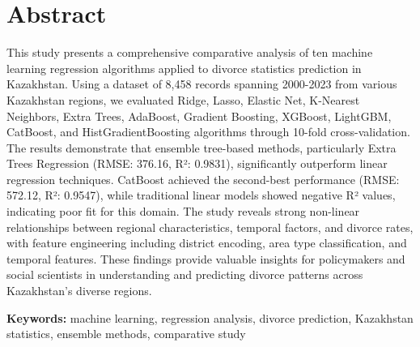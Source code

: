 %
%
\chapter{Abstract}
\begin{SingleSpace}
This study presents a comprehensive comparative analysis of ten machine learning regression algorithms applied to divorce statistics prediction in Kazakhstan. Using a dataset of 8,458 records spanning 2000-2023 from various Kazakhstan regions, we evaluated Ridge, Lasso, Elastic Net, K-Nearest Neighbors, Extra Trees, AdaBoost, Gradient Boosting, XGBoost, LightGBM, CatBoost, and HistGradientBoosting algorithms through 10-fold cross-validation. The results demonstrate that ensemble tree-based methods, particularly Extra Trees Regression (RMSE: 376.16, R²: 0.9831), significantly outperform linear regression techniques. CatBoost achieved the second-best performance (RMSE: 572.12, R²: 0.9547), while traditional linear models showed negative R² values, indicating poor fit for this domain. The study reveals strong non-linear relationships between regional characteristics, temporal factors, and divorce rates, with feature engineering including district encoding, area type classification, and temporal features. These findings provide valuable insights for policymakers and social scientists in understanding and predicting divorce patterns across Kazakhstan's diverse regions.

\vspace{1em}
\noindent\textbf{Keywords:} machine learning, regression analysis, divorce prediction, Kazakhstan statistics, ensemble methods, comparative study

\end{SingleSpace}
